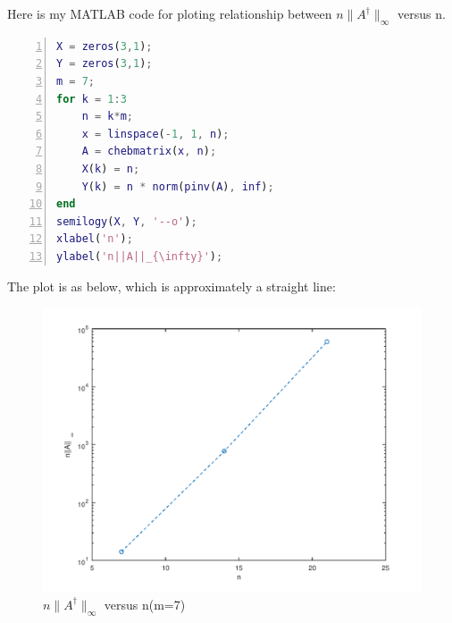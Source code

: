 \documentclass[a4paper, 11pt]{article}
\begin{document}
Here is my MATLAB code for ploting relationship between $n\|A^{\dagger}\|_{\infty}$ versus n.
\begin{lstlisting}[language = Matlab, numbers=left,   
  numberstyle=\tiny,keywordstyle=\color{blue!70},  
  commentstyle=\color{red!50!green!50!blue!50},frame=shadowbox,  
  rulesepcolor=\color{red!20!green!20!blue!20},basicstyle=\ttfamily,
  tabsize=2]
X = zeros(3,1);
Y = zeros(3,1);
m = 7;
for k = 1:3
	n = k*m;
	x = linspace(-1, 1, n);
	A = chebmatrix(x, n);
	X(k) = n;
	Y(k) = n * norm(pinv(A), inf);
end
semilogy(X, Y, '--o');
xlabel('n');
ylabel('n||A||_{\infty}');
\end{lstlisting}
The plot is as below, which is approximately a straight line:
\begin{figure}[htbp]
\centering
	\includegraphics[scale=0.6]{figure/p1.png}
	\caption{$n\|A^{\dagger}\|_{\infty}$ versus n(m=7)}
	\label{fig1}
\end{figure}

\newpage
\end{document}
